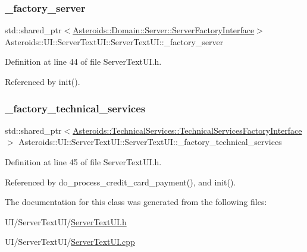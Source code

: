 \subsubsection{\texorpdfstring{\+\_\+factory\+\_\+server}{\_factory\_server}}
{\footnotesize\ttfamily std\+::shared\+\_\+ptr$<$\hyperlink{classAsteroids_1_1Domain_1_1Server_1_1ServerFactoryInterface}{Asteroids\+::\+Domain\+::\+Server\+::\+Server\+Factory\+Interface}$>$ Asteroids\+::\+U\+I\+::\+Server\+Text\+U\+I\+::\+Server\+Text\+U\+I\+::\+\_\+factory\+\_\+server\hspace{0.3cm}{\ttfamily [private]}}



Definition at line 44 of file Server\+Text\+U\+I.\+h.



Referenced by init().

\mbox{\label{classAsteroids_1_1UI_1_1ServerTextUI_1_1ServerTextUI_afec311ead683a6411254d2c6ab96e4af}} 
\subsubsection{\texorpdfstring{\+\_\+factory\+\_\+technical\+\_\+services}{\_factory\_technical\_services}}
{\footnotesize\ttfamily std\+::shared\+\_\+ptr$<$\hyperlink{classAsteroids_1_1TechnicalServices_1_1TechnicalServicesFactoryInterface}{Asteroids\+::\+Technical\+Services\+::\+Technical\+Services\+Factory\+Interface}$>$ Asteroids\+::\+U\+I\+::\+Server\+Text\+U\+I\+::\+Server\+Text\+U\+I\+::\+\_\+factory\+\_\+technical\+\_\+services\hspace{0.3cm}{\ttfamily [private]}}



Definition at line 45 of file Server\+Text\+U\+I.\+h.



Referenced by do\+\_\+process\+\_\+credit\+\_\+card\+\_\+payment(), and init().



The documentation for this class was generated from the following files\+:\begin{DoxyCompactItemize}
\item 
U\+I/\+Server\+Text\+U\+I/\hyperlink{ServerTextUI_8h}{Server\+Text\+U\+I.\+h}\item 
U\+I/\+Server\+Text\+U\+I/\hyperlink{ServerTextUI_8cpp}{Server\+Text\+U\+I.\+cpp}\end{DoxyCompactItemize}

